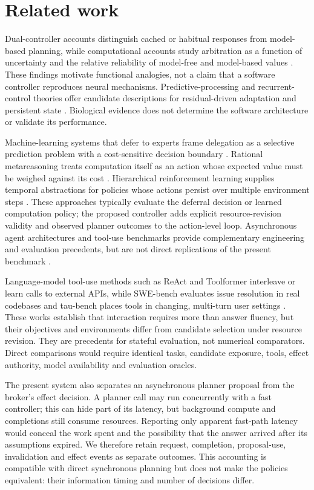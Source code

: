 \documentclass[11pt]{article}
\begin{document}
\section{Related work}
Dual-controller accounts distinguish cached or habitual responses from model-based planning, while computational accounts study arbitration as a function of uncertainty and the relative reliability of model-free and model-based values \cite{daw2005,lee2014,kool2016}. These findings motivate functional analogies, not a claim that a software controller reproduces neural mechanisms. Predictive-processing and recurrent-control theories offer candidate descriptions for residual-driven adaptation and persistent state \cite{rao1999,mante2013}. Biological evidence does not determine the software architecture or validate its performance.

Machine-learning systems that defer to experts frame delegation as a selective prediction problem with a cost-sensitive decision boundary \cite{madras2018,mozannar2020}. Rational metareasoning treats computation itself as an action whose expected value must be weighed against its cost \cite{russell1991}. Hierarchical reinforcement learning supplies temporal abstractions for policies whose actions persist over multiple environment steps \cite{sutton1999}. These approaches typically evaluate the deferral decision or learned computation policy; the proposed controller adds explicit resource-revision validity and observed planner outcomes to the action-level loop. Asynchronous agent architectures and tool-use benchmarks provide complementary engineering and evaluation precedents, but are not direct replications of the present benchmark \cite{dptagent,toolsandbox}.

Language-model tool-use methods such as ReAct and Toolformer interleave or learn calls to external APIs, while SWE-bench evaluates issue resolution in real codebases and tau-bench places tools in changing, multi-turn user settings \cite{react,toolformer,swebench,taubench}. These works establish that interaction requires more than answer fluency, but their objectives and environments differ from candidate selection under resource revision. They are precedents for stateful evaluation, not numerical comparators. Direct comparisons would require identical tasks, candidate exposure, tools, effect authority, model availability and evaluation oracles.

The present system also separates an asynchronous planner proposal from the broker's effect decision. A planner call may run concurrently with a fast controller; this can hide part of its latency, but background compute and completions still consume resources. Reporting only apparent fast-path latency would conceal the work spent and the possibility that the answer arrived after its assumptions expired. We therefore retain request, completion, proposal-use, invalidation and effect events as separate outcomes. This accounting is compatible with direct synchronous planning but does not make the policies equivalent: their information timing and number of decisions differ.
\end{document}
